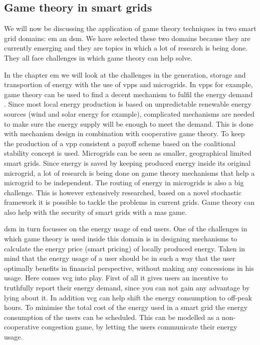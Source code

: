 \subsection{Game theory in smart grids}
We will now be discussing the application of game theory techniques in two smart grid domains: \ac{em} an \ac{dsm}. We have selected these two domains because they are currently emerging and they are topics in which a lot of research is being done. They all face challenges in which game theory can help solve. 

In the chapter \ac{em} we will look at the challenges in the generation, storage and transportion of energy with the use of \acp{vpp} and microgrids. 
In \acp{vpp} for example, game theory can be used to find a decent mechanism to fulfil the energy demand . Since most local energy production is based on unpredictable renewable energy sources (wind and solar energy for example), complicated mechanisms are needed to make sure the energy supply will be enough to meet the demand. This is done with mechanism design in combination with cooperative game theory. To keep the production of a \ac{vpp} consistent a payoff scheme based on the coalitional stability concept is used.
Microgrids can be seen as smaller, geographical limited smart grids. Since energy is saved by keeping produced energy inside its original microgrid, a lot of research is being done on game theory mechanisms that help a microgrid to be independent. 
The routing of energy in microgrids is also a big challenge. This is however extensively researched, based on a novel stochastic framework it is possible to tackle the problems in current grids. Game theory can also help with the security of smart grids with a \ac{mas} game. 

\ac{dsm} in turn focusses on the energy usage of end users. One of the challenges in which game theory is used inside this domain is in designing mechanisms to calculate the energy price (smart pricing) of locally produced energy. Taken in mind that the energy usage of a user should be in such a way that the user optimally benefits in financial perspective, without making any concessions in his usage. Here comes \ac{vcg} into play. First of all it gives users an incentive to truthfully report their energy demand, since you can not gain any advantage by lying about it. In addition \ac{vcg} can help shift the energy consumption to off-peak hours.  
To minimise the total cost of the energy used in a smart grid the energy consumption of the users can be scheduled. This can be modelled as a non-cooperative congestion game, by letting the users communicate their energy usage.